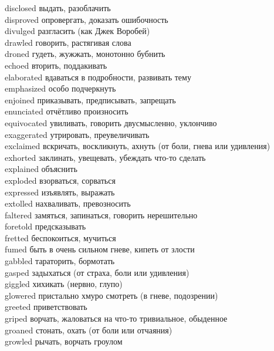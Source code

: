 \documentclass[a4paper,12pt,fleqn]{book}\usepackage{cooltooltips}\usepackage{polyglossia}\setdefaultlanguage[babelshorthands=true]{russian}\setotherlanguage{english}\defaultfontfeatures{Ligatures=TeX,Mapping=tex-text} \usepackage{xcolor}\definecolor{lightgray}{HTML}{bbbbbb}\color{lightgray}\newcommand{\ml}[3]{\textenglish{\textcolor{black}{#3}}}
\begin{document}
{disclosed \hfill выдать, разоблачить\\
disproved \hfill опровергать, доказать ошибочность\\
divulged \hfill разгласить (как Джек Воробей)\\
drawled \hfill говорить, растягивая слова\\
droned \hfill гудеть, жужжать, монотонно бубнить\\
echoed \hfill вторить, поддакивать\\
elaborated \hfill вдаваться в подробности, развивать тему\\
emphasized \hfill особо подчеркнуть\\
enjoined \hfill приказывать, предписывать, запрещать\\
enunciated \hfill отчётливо произносить\\
equivocated \hfill увиливать, говорить двусмысленно, уклончиво\\
exaggerated \hfill утрировать, преувеличивать\\
exclaimed \hfill вскричать, воскликнуть, ахнуть (от боли, гнева или удивления)\\
exhorted \hfill заклинать, увещевать, убеждать что-то сделать\\
explained \hfill объяснить\\
exploded \hfill взорваться, сорваться\\
expressed \hfill изъявлять, выражать\\
extolled \hfill нахваливать, превозносить\\
faltered \hfill замяться, запинаться, говорить нерешительно\\
foretold \hfill предсказывать\\
fretted \hfill беспокоиться, мучиться\\
fumed \hfill быть в очень сильном гневе, кипеть от злости\\
gabbled \hfill тараторить, бормотать\\
gasped \hfill задыхаться (от страха, боли или удивления)\\
giggled \hfill хихикать (нервно, глупо)\\
glowered \hfill пристально хмуро смотреть (в гневе, подозрении)\\
greeted \hfill приветствовать\\
griped \hfill ворчать, жаловаться на что-то тривиальное, обыденное\\
groaned \hfill стонать, охать (от боли или отчаяния)\\
growled \hfill рычать, ворчать гроулом\\
}
\end{document}
